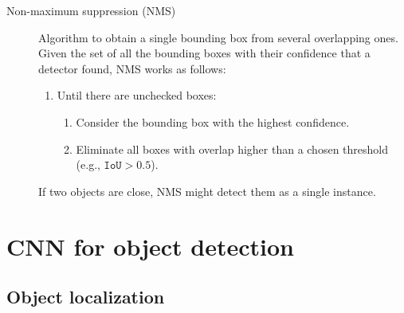 \begin{description}
    \item[Non-maximum suppression (NMS)] 
        Algorithm to obtain a single bounding box from several overlapping ones. Given the set of all the bounding boxes with their confidence that a detector found, NMS works as follows:
        \begin{enumerate}
            \item Until there are unchecked boxes:
            \begin{enumerate}
                \item Consider the bounding box with the highest confidence.
                \item Eliminate all boxes with overlap higher than a chosen threshold (e.g., $\texttt{IoU} > 0.5$).
            \end{enumerate}
        \end{enumerate}

        \begin{remark}
            If two objects are close, NMS might detect them as a single instance.
        \end{remark}
\end{description}



\section{CNN for object detection}


\subsection{Object localization}

